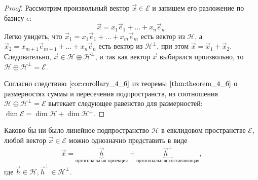 \begin{proof}
    Рассмотрим произвольный вектор $\vec{x} \in \mathcal{E}$ и запишем его разложение по базису $e$:
    $$\vec{x} = x_1\vec{e}_1 + \ldots + x_n\vec{e}_n.$$
    Легко увидеть, что $\vec{x}_1 = x_1\vec{e}_1 + \ldots + x_m\vec{e}_m$ есть вектор из $\mathcal{H}$, а $\vec{x}_2 = x_{m + 1}\vec{e}_{m + 1} + \ldots + x_n\vec{e}_n$ есть вектор из $\mathcal{H}^\perp$, при этом $\vec{x} = \vec{x}_1 + \vec{x}_2$. Следовательно, $\vec{x} \in \mathcal{H} \oplus \mathcal{H}^\perp$, и так как вектор $\vec{x}$ выбирался произвольно, то $\mathcal{H} \oplus \mathcal{H}^\perp = \mathcal{E}$.

    Согласно следствию $\eqref{cor:corollary_4_6}$ из теоремы $\eqref{thm:theorem_4_6}$ о размерностях суммы и пересечения подпространств, из соотношения $\mathcal{H} \oplus \mathcal{H}^\perp = \mathcal{E}$ вытекает следующее равенство для размерностей: $\dim \mathcal{E} = \dim \mathcal{H} + \dim \mathcal{H}^\perp$.
\end{proof}

\begin{corollary}
    Каково бы ни было линейное подпространство $\mathcal{H}$ в евклидовом пространстве $\mathcal{E}$, любой вектор $\vec{x} \in \mathcal{E}$ можно однозначно представить в виде
    \begin{equation}
        \vec{x} = \underbrace{\vec{h}}_{\text{ортогональная проекция}} + \underbrace{\vec{h}^\perp}_{\text{ортогональная составляющая}},
    \end{equation}
    где $\vec{h} \in \mathcal{H}, \vec{h}^\perp \in \mathcal{H}^\perp$.
\end{corollary}
